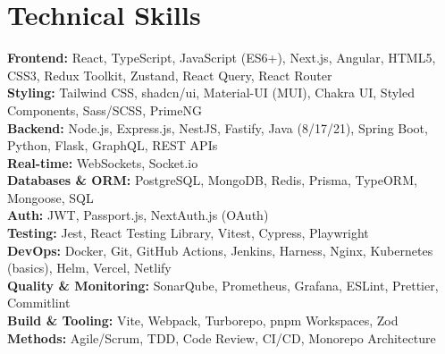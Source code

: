 \documentclass[10pt,a4paper]{article}
\begin{document}
\section*{Technical Skills}
{\small
\textbf{Frontend:} React, TypeScript, JavaScript (ES6+), Next.js, Angular, HTML5, CSS3, Redux Toolkit, Zustand, React Query, React Router\\[2pt]
\textbf{Styling:} Tailwind CSS, shadcn/ui, Material-UI (MUI), Chakra UI, Styled Components, Sass/SCSS, PrimeNG\\[2pt]
\textbf{Backend:} Node.js, Express.js, NestJS, Fastify, Java (8/17/21), Spring Boot, Python, Flask, GraphQL, REST APIs\\[2pt]
\textbf{Real-time:} WebSockets, Socket.io\\[2pt]
\textbf{Databases \& ORM:} PostgreSQL, MongoDB, Redis, Prisma, TypeORM, Mongoose, SQL\\[2pt]
\textbf{Auth:} JWT, Passport.js, NextAuth.js (OAuth)\\[2pt]
\textbf{Testing:} Jest, React Testing Library, Vitest, Cypress, Playwright\\[2pt]
\textbf{DevOps:} Docker, Git, GitHub Actions, Jenkins, Harness, Nginx, Kubernetes (basics), Helm, Vercel, Netlify\\[2pt]
\textbf{Quality \& Monitoring:} SonarQube, Prometheus, Grafana, ESLint, Prettier, Commitlint\\[2pt]
\textbf{Build \& Tooling:} Vite, Webpack, Turborepo, pnpm Workspaces, Zod\\[2pt]
\textbf{Methods:} Agile/Scrum, TDD, Code Review, CI/CD, Monorepo Architecture
}

\end{document}
